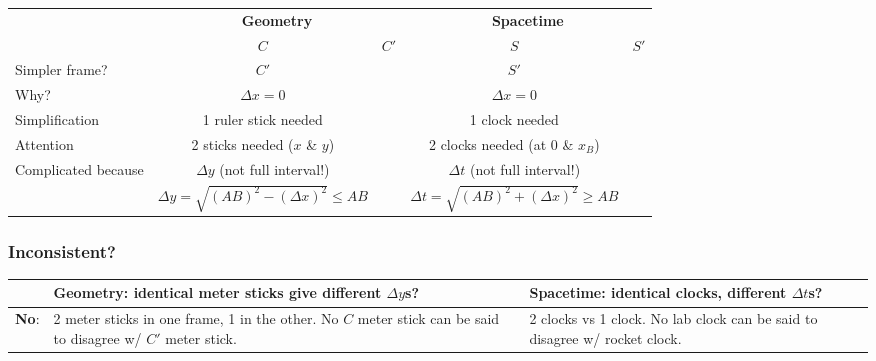 \begin{center}
\end{center}

\begin{center}
\renewcommand{\arraystretch}{1.5}
\begin{tabular}{l|cc|cc}
  & \multicolumn{2}{c|}{\textbf{Geometry}} & \multicolumn{2}{c}{\textbf{Spacetime}} \\
  & $C$ & $C'$ & $S$ & $S'$ \\
  \hline
  Simpler frame? & $C'$ & & $S'$ & \\
  Why? & $\Delta x=0$ & & $\Delta x=0$ & \\
  Simplification & 1 ruler stick needed & & 1 clock needed & \\
  Attention & 2 sticks needed ($x$ \& $y$) & & 2 clocks needed (at $0$ \& $x_B$) & \\
  Complicated because & $\Delta y$ (not full interval!) & & $\Delta t$ (not full interval!) & \\
  & $\Delta y = \sqrt{(AB)^2-(\Delta x)^2} \leq AB$ & &
    $\Delta t = \sqrt{(AB)^2+(\Delta x)^2} \geq AB$ & \\
\end{tabular}
\end{center}

\subsubsection*{Inconsistent?}

\begin{center}
\renewcommand{\arraystretch}{1.4}
\begin{tabular}{p{}p{}p{}}
  & \textbf{Geometry:} identical meter sticks give different $\Delta y$s? &
    \textbf{Spacetime:} identical clocks, different $\Delta t$s? \\
  \hline
  \textbf{No}: & 2 meter sticks in one frame, 1 in the other.
    No $C$ meter stick can be said to disagree w/ $C'$ meter stick. &
    2 clocks vs 1 clock. No lab clock can be said to disagree w/ rocket clock. \\
\end{tabular}
\end{center}

